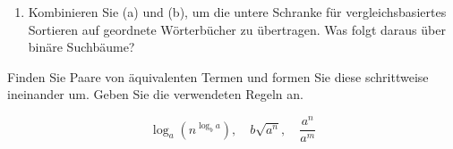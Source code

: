 \documentclass[a4paper]{assignment}
\begin{document}
\begin{problemlist}
\begin{enumerate}
\item Kombinieren Sie (a) und (b), um die untere Schranke für vergleichsbasiertes Sortieren auf geordnete Wörterbücher zu übertragen. Was folgt daraus über binäre Suchbäume?

\begin{answer}

\end{answer}

\end{enumerate}


Finden Sie Paare von äquivalenten Termen und formen Sie diese schrittweise ineinander um. Geben Sie die verwendeten Regeln an.

\[
\log_a\left(n^{\log_b a}\right), \quad b{\sqrt{a^n}}, \quad \frac{a^n}{a^m}
\]


	
	
	
\end{problemlist}

\end{document}
